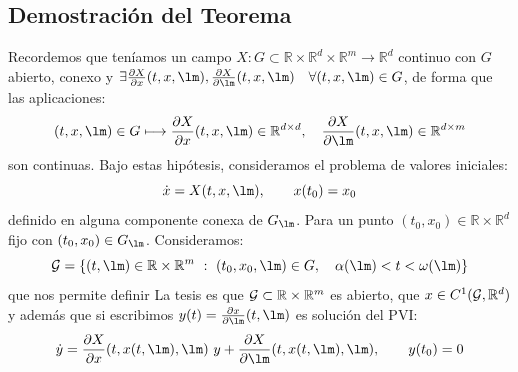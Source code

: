 \subsection{Demostración del Teorema} %
\noindent
Recordemos que teníamos un campo $X:G\subset\mathbb{R}\times\mathbb{R}^d\times\mathbb{R}^m\to\mathbb{R}^d$ continuo con $G$ abierto, conexo y $\exists \frac{\partial X}{\partial x}(t,x,\lm),\frac{\partial X}{\partial \lm}(t,x,\lm)\quad \forall (t,x,\lm)\in G$, de forma que las aplicaciones:
\begin{equation*}
    (t,x,\lm)\in G\longmapsto \frac{\partial X}{\partial x}(t,x,\lm)\in \mathbb{R}^{d\times d},\quad \frac{\partial X}{\partial \lm}(t,x,\lm)\in \mathbb{R}^{d\times m}
\end{equation*}
son continuas. Bajo estas hipótesis, consideramos el problema de valores iniciales:
\begin{equation*}
    \dot{x} = X(t,x,\lm), \qquad x(t_0) = x_0
\end{equation*}
definido en alguna componente conexa de $G_\lm$. Para un punto $(t_0,x_0)\in \mathbb{R}\times\mathbb{R}^d$ fijo con $(t_0,x_0)\in G_\lm$. Consideramos:
\begin{equation*}
    \cc{G} = \{(t,\lm)\in \mathbb{R}\times\mathbb{R}^m~:~(t_0,x_0,\lm)\in G,\quad \alpha(\lm)<t<\omega(\lm)\}
\end{equation*}
que nos permite definir
La tesis es que $\mathcal{G}\subset \mathbb{R}\times\mathbb{R}^m$ es abierto, que $x\in C^1(\mathcal{G},\mathbb{R}^d)$ y además que si escribimos $y(t) = \frac{\partial x}{\partial \lm}(t,\lm)$ es solución del PVI:
\begin{equation*}
    \dot{y} = \frac{\partial X}{\partial x}(t,x(t,\lm),\lm)\ y + \frac{\partial X}{\partial \lm}(t,x(t,\lm),\lm),\qquad y(t_0) = 0
\end{equation*}
